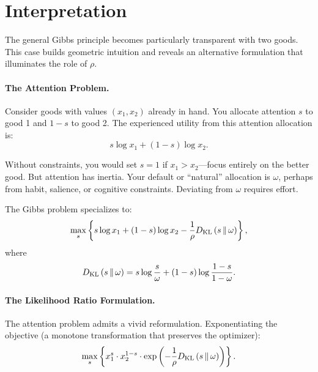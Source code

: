 \section{Interpretation}

The general Gibbs principle becomes particularly transparent with two goods. This case builds geometric intuition and reveals an alternative formulation that illuminates the role of $\rho$.

\paragraph{The Attention Problem.}

Consider goods with values $(x_1, x_2)$ already in hand. You allocate attention $s$ to good 1 and $1-s$ to good 2. The experienced utility from this attention allocation is:
\begin{equation}
s \log x_1 + (1-s) \log x_2.
\end{equation}

Without constraints, you would set $s = 1$ if $x_1 > x_2$---focus entirely on the better good. But attention has inertia. Your default or ``natural'' allocation is $\omega$, perhaps from habit, salience, or cognitive constraints. Deviating from $\omega$ requires effort.

The Gibbs problem specializes to:
\begin{equation}
\label{eq:attention-two-good}
\max_s \left\{ s \log x_1 + (1-s) \log x_2 - \frac{1}{\rho} D_{\mathrm{KL}}\left(s \,\|\, \omega\right) \right\},
\end{equation}
where
\begin{equation}
D_{\mathrm{KL}}\left(s \,\|\, \omega\right) = s \log \frac{s}{\omega} + (1-s) \log \frac{1-s}{1-\omega}.
\end{equation}

\paragraph{The Likelihood Ratio Formulation.}

The attention problem admits a vivid reformulation. Exponentiating the objective (a monotone transformation that preserves the optimizer):
\begin{equation}
\max_s \left\{ x_1^s \cdot x_2^{1-s} \cdot \exp\left(-\frac{1}{\rho}D_{\mathrm{KL}}\left(s \,\|\, \omega\right)\right) \right\}.
\end{equation}

